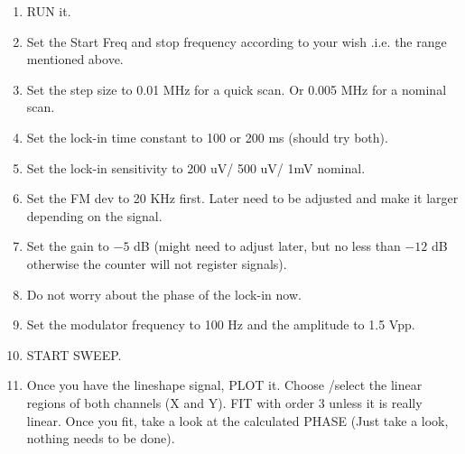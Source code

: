 {\begin{enumerate}
%
%
%

\item RUN it.

\item Set the Start Freq and stop frequency according to your wish .i.e. the range mentioned above.

\item Set the step size to 0.01 MHz for a quick scan. Or 0.005 MHz for a 
nominal scan.

\item Set the lock-in time constant to 100 or 200 ms (should try both).

\item Set the lock-in sensitivity to 200 uV/ 500 uV/ 1mV nominal.

\item Set the FM dev to 20 KHz first. Later need to be adjusted and make it 
larger depending on the signal. 

\item Set the gain to $-5$ dB (might need to adjust later, but no less than 
$-12$ dB otherwise the counter will not register signals).

\item Do not worry about the phase of the lock-in now.

\item Set the modulator frequency to 100 Hz and the amplitude to 1.5 Vpp.

\item START SWEEP.

\item Once you have the lineshape signal, PLOT it. Choose /select the linear 
regions of both channels (X and Y). FIT with order 3 unless it is really 
linear. Once you fit, take a look at the calculated PHASE (Just take a look, 
nothing needs to be done).


\end{enumerate}}
